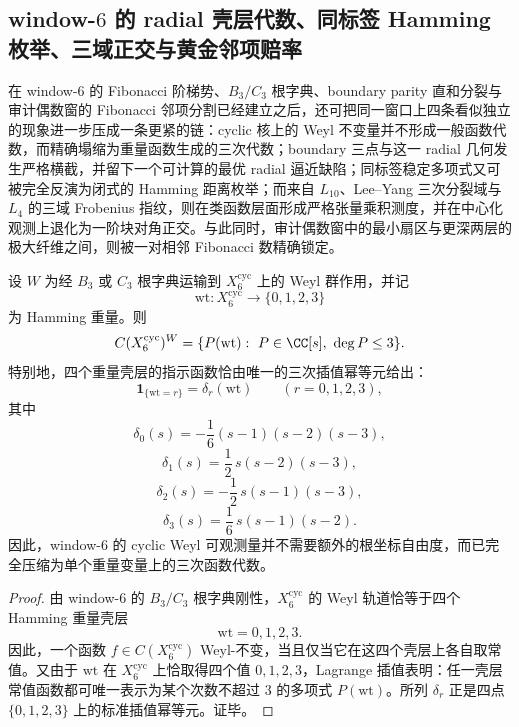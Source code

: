 \subsection{window-\texorpdfstring{$6$}{6} 的 radial 壳层代数、同标签 Hamming 枚举、三域正交与黄金邻项赔率}\label{subsec:conclusion-window6-radial-hamming-orthogonality-fibonacci-odds}
在 window-\(6\) 的 Fibonacci 阶梯势、\(B_3/C_3\) 根字典、boundary parity 直和分裂与审计偶数窗的 Fibonacci 邻项分割已经建立之后，还可把同一窗口上四条看似独立的现象进一步压成一条更紧的链：cyclic 核上的 Weyl 不变量并不形成一般函数代数，而精确塌缩为重量函数生成的三次代数；boundary 三点与这一 radial 几何发生严格横截，并留下一个可计算的最优 radial 逼近缺陷；同标签稳定多项式又可被完全反演为闭式的 Hamming 距离枚举；而来自 \(L_{10}\)、Lee--Yang 三次分裂域与 \(L_4\) 的三域 Frobenius 指纹，则在类函数层面形成严格张量乘积测度，并在中心化观测上退化为一阶块对角正交。与此同时，审计偶数窗中的最小扇区与更深两层的极大纤维之间，则被一对相邻 Fibonacci 数精确锁定。

\begin{theorem}\label{thm:conclusion-window6-radial-observable-algebra}
设 \(W\) 为经 \(B_3\) 或 \(C_3\) 根字典运输到 \(X_6^{\mathrm{cyc}}\) 上的 Weyl 群作用，并记
\[
\mathrm{wt}:X_6^{\mathrm{cyc}}\to \{0,1,2,3\}
\]
为 Hamming 重量。则
\[
C(X_6^{\mathrm{cyc}})^W
=
\{P(\mathrm{wt}):\ P\in \CC[s],\ \deg P\le 3\}.
\]
特别地，四个重量壳层的指示函数恰由唯一的三次插值幂等元给出：
\[
\mathbf 1_{\{\mathrm{wt}=r\}}=\delta_r(\mathrm{wt})
\qquad (r=0,1,2,3),
\]
其中
\[
\delta_0(s)=-\frac16(s-1)(s-2)(s-3),
\]
\[
\delta_1(s)=\frac12\,s(s-2)(s-3),
\]
\[
\delta_2(s)=-\frac12\,s(s-1)(s-3),
\]
\[
\delta_3(s)=\frac16\,s(s-1)(s-2).
\]
因此，window-\(6\) 的 cyclic Weyl 可观测量并不需要额外的根坐标自由度，而已完全压缩为单个重量变量上的三次函数代数。
\end{theorem}
\begin{proof}
由 window-\(6\) 的 \(B_3/C_3\) 根字典刚性，\(X_6^{\mathrm{cyc}}\) 的 Weyl 轨道恰等于四个 Hamming 重量壳层
\[
\mathrm{wt}=0,1,2,3.
\]
因此，一个函数 \(f\in C(X_6^{\mathrm{cyc}})\) Weyl-不变，当且仅当它在这四个壳层上各自取常值。又由于 \(\mathrm{wt}\) 在 \(X_6^{\mathrm{cyc}}\) 上恰取得四个值 \(0,1,2,3\)，Lagrange 插值表明：任一壳层常值函数都可唯一表示为某个次数不超过 \(3\) 的多项式 \(P(\mathrm{wt})\)。所列 \(\delta_r\) 正是四点 \(\{0,1,2,3\}\) 上的标准插值幂等元。证毕。
\end{proof}

